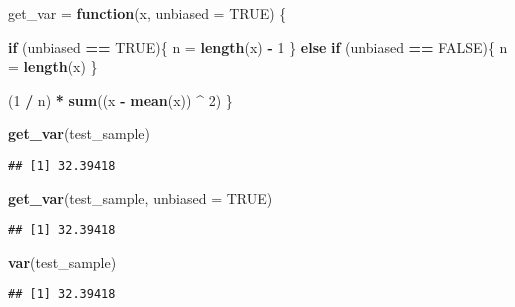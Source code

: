 \documentclass[]{book}
\newenvironment{Shaded}{\begin{snugshade}}{\end{snugshade}}
\newcommand{\KeywordTok}[1]{\textcolor[rgb]{0.13,0.29,0.53}{\textbf{#1}}}
\newcommand{\DataTypeTok}[1]{\textcolor[rgb]{0.13,0.29,0.53}{#1}}
\newcommand{\DecValTok}[1]{\textcolor[rgb]{0.00,0.00,0.81}{#1}}
\newcommand{\StringTok}[1]{\textcolor[rgb]{0.31,0.60,0.02}{#1}}
\newcommand{\OtherTok}[1]{\textcolor[rgb]{0.56,0.35,0.01}{#1}}
\newcommand{\ControlFlowTok}[1]{\textcolor[rgb]{0.13,0.29,0.53}{\textbf{#1}}}
\newcommand{\OperatorTok}[1]{\textcolor[rgb]{0.81,0.36,0.00}{\textbf{#1}}}
\newcommand{\NormalTok}[1]{#1}
\begin{document}
\begin{Shaded}
\begin{Highlighting}[]
\NormalTok{get_var =}\StringTok{ }\ControlFlowTok{function}\NormalTok{(x, }\DataTypeTok{unbiased =} \OtherTok{TRUE}\NormalTok{) \{}

  \ControlFlowTok{if}\NormalTok{ (unbiased }\OperatorTok{==}\StringTok{ }\OtherTok{TRUE}\NormalTok{)\{}
\NormalTok{    n =}\StringTok{ }\KeywordTok{length}\NormalTok{(x) }\OperatorTok{-}\StringTok{ }\DecValTok{1}
\NormalTok{  \} }\ControlFlowTok{else} \ControlFlowTok{if}\NormalTok{ (unbiased }\OperatorTok{==}\StringTok{ }\OtherTok{FALSE}\NormalTok{)\{}
\NormalTok{    n =}\StringTok{ }\KeywordTok{length}\NormalTok{(x) }
\NormalTok{   \}}

\NormalTok{  (}\DecValTok{1} \OperatorTok{/}\StringTok{ }\NormalTok{n) }\OperatorTok{*}\StringTok{ }\KeywordTok{sum}\NormalTok{((x }\OperatorTok{-}\StringTok{ }\KeywordTok{mean}\NormalTok{(x)) }\OperatorTok{^}\StringTok{ }\DecValTok{2}\NormalTok{)}
\NormalTok{\}}
\end{Highlighting}
\end{Shaded}

\begin{Shaded}
\begin{Highlighting}[]
\KeywordTok{get_var}\NormalTok{(test_sample)}
\end{Highlighting}
\end{Shaded}

\begin{verbatim}
## [1] 32.39418
\end{verbatim}

\begin{Shaded}
\begin{Highlighting}[]
\KeywordTok{get_var}\NormalTok{(test_sample, }\DataTypeTok{unbiased =} \OtherTok{TRUE}\NormalTok{)}
\end{Highlighting}
\end{Shaded}

\begin{verbatim}
## [1] 32.39418
\end{verbatim}

\begin{Shaded}
\begin{Highlighting}[]
\KeywordTok{var}\NormalTok{(test_sample)}
\end{Highlighting}
\end{Shaded}

\begin{verbatim}
## [1] 32.39418
\end{verbatim}
\end{document}
